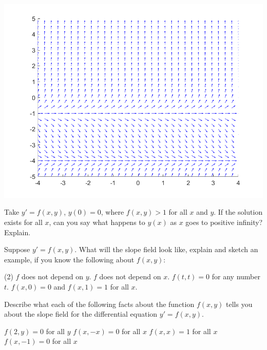 \begin{minipage}{0.32\textwidth}
\includegraphics[width=\textwidth]{Images/yprimeyp1yp4slope}
\end{minipage}

\begin{exercise}[challenging]
Take $y' = f(x,y)$, $y(0) = 0$, where $f(x,y) > 1$
for all $x$ and $y$.  If
the solution exists for all $x$, can you say
what happens to $y(x)$ as $x$ goes to positive infinity?  Explain.
\end{exercise}

\begin{exercise}
Suppose $y' = f(x,y)$.  What will the slope field look like, explain and
sketch an example, if you know the following about $f(x,y)$:
\begin{tasks}(2)
\task $f$ does
not depend on $y$.
\task $f$ does not depend on $x$.
\task $f(t,t) = 0$ for any
number $t$.
\task $f(x,0) = 0$ and $f(x,1) = 1$ for all $x$.
\end{tasks}
\end{exercise}

\begin{exercise}
Describe what each of the following facts about the function $f(x,y)$ tells you about the slope field for the differential equation $y' = f(x,y)$.
\begin{tasks}
\task $f(2,y) = 0$ for all $y$
\task $f(x,-x) = 0$ for all $x$
\task $f(x,x) = 1$ for all $x$
\task $f(x, -1) = 0$ for all $x$
\end{tasks}
\end{exercise}

\setcounter{exercise}{100}


